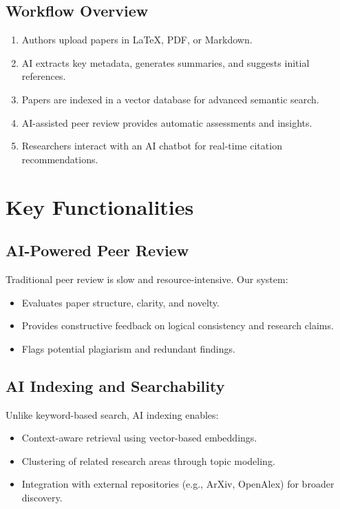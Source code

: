 \documentclass{article}
\begin{document}
\subsection{Workflow Overview}
\begin{enumerate}
    \item Authors upload papers in LaTeX, PDF, or Markdown.
    \item AI extracts key metadata, generates summaries, and suggests initial references.
    \item Papers are indexed in a vector database for advanced semantic search.
    \item AI-assisted peer review provides automatic assessments and insights.
    \item Researchers interact with an AI chatbot for real-time citation recommendations.
\end{enumerate}

\section{Key Functionalities}
\subsection{AI-Powered Peer Review}
Traditional peer review is slow and resource-intensive. Our system:
\begin{itemize}
    \item Evaluates paper structure, clarity, and novelty.
    \item Provides constructive feedback on logical consistency and research claims.
    \item Flags potential plagiarism and redundant findings.
\end{itemize}

\subsection{AI Indexing and Searchability}
Unlike keyword-based search, AI indexing enables:
\begin{itemize}
    \item Context-aware retrieval using vector-based embeddings.
    \item Clustering of related research areas through topic modeling.
    \item Integration with external repositories (e.g., ArXiv, OpenAlex) for broader discovery.
\end{itemize}
\end{document}
